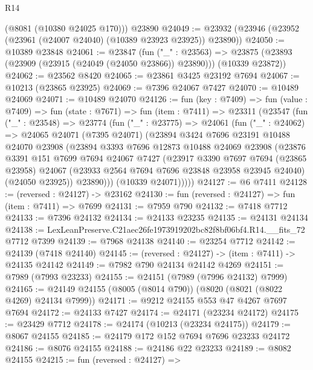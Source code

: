 \begin{lexlean}{R14}
\begin{coremodule}
      (@8081 (@10380 @24025 @170)))
    @23890
@24049 := @23932 (@23946 (@23952 (@23961 (@24007 @24040) (@10389 @23923 @23925)) @23890))
@24050 := @10389 @23848
@24061 := @23847
    (fun ("_" : @23563) =>
    @23875 (@23893 (@23909 (@23915 (@24049 (@24050 @23866)) @23890))) (@10339 @23872))
@24062 := @23562 @8420
@24065 := @23861 @3425 @23192 @7694
@24067 := @10213 (@23865 @23925)
@24069 := @7396 @24067 @7427
@24070 := @10489 @24069
@24071 := @10489 @24070
@24126 := fun (key : @7409) =>
  fun (value : @7409) =>
  fun (state : @7671) =>
  fun (item : @7411) =>
  @23311
    (@23547
      (fun ("_" : @23548) =>
      @23774
        (fun ("_" : @23775) =>
        @24061
          (fun ("_" : @24062) =>
          @24065
            @24071
            (@7395 @24071)
            (@23894
              @3424
              @7696
              @23191
              @10488
              @24070
              @23908
              (@23894
                @3393
                @7696
                @12873
                @10488
                @24069
                @23908
                (@23876
                  @3391
                  @151
                  @7699
                  @7694
                  @24067
                  @7427
                  (@23917
                    @3390
                    @7697
                    @7694
                    (@23865 @23958)
                    @24067
                    (@23933 @2564 @7694 @7696 @23848 @23958 @23945 @24040)
                    (@24050 @23925))
                  @23890)))
            (@10339 @24071)))))
@24127 := @6 @7411
@24128 := (reversed : @24127) -> @23162
@24130 := fun (reversed : @24127) => fun (item : @7411) => @7699
@24131 := @7959 @790
@24132 := @7418 @7712
@24133 := @7396 @24132
@24134 := @24133 @23235
@24135 := @24131 @24134
@24138 := LexLeanPreserve.C21aec26fe1973919202bc82f8bf06bf4.R14.__fits_72 @7712 @7399
@24139 := @7968 @24138
@24140 := @23254 @7712
@24142 := @24139 (@7418 @24140)
@24145 := (reversed : @24127) -> (item : @7411) -> @24135 @24142
@24149 := @7982 @790 @24134 @24142 @4269
@24151 := @7989 (@7993 @23233)
@24155 := @24151 (@7989 (@7996 @24132) @7999)
@24165 := @24149 @24155 (@8005 (@8014 @790)) (@8020 (@8021 (@8022 @4269) @24134 @7999))
@24171 := @9212 @24155 @553 @47 @4267 @7697 @7694
@24172 := @24133 @7427
@24174 := @24171 (@23234 @24172)
@24175 := @23429 @7712
@24178 := @24174 (@10213 (@23234 @24175))
@24179 := @8067 @24155
@24185 := @24179 @172 @152 @7694 @7696 @23233 @24172
@24186 := @8076 @24155
@24188 := @24186 @22 @23233
@24189 := @8082 @24155
@24215 := fun (reversed : @24127) =>

\end{coremodule}
\end{lexlean}
